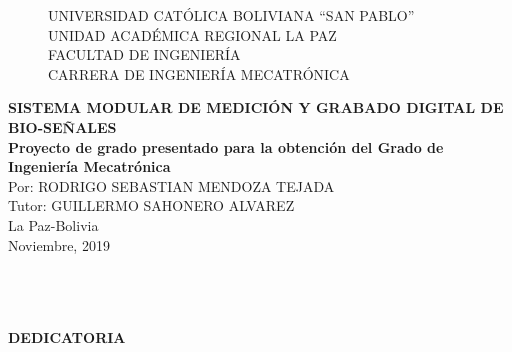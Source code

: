 \begin{center}
\begin{figure}
\centering%
\textsc{\large UNIVERSIDAD CAT\'OLICA BOLIVIANA ``SAN PABLO'' }\\[0.3cm] %
\textsc{\large UNIDAD ACAD\'EMICA REGIONAL LA PAZ}\\[0.3cm] %
\textsc{\large FACULTAD DE INGENIER\'IA}\\[0.3cm]
\textsc{\normalsize  CARRERA DE INGENIER\'IA MECATR\'ONICA}\\[0.1cm]
%
\end{figure}
\textbf{\large SISTEMA MODULAR DE MEDICIÓN Y GRABADO DIGITAL DE BIO-SEÑALES}\\[0.5cm]

\thispagestyle{empty} \vspace*{0.01cm} \textbf{\large Proyecto de grado presentado para la obtenci\'on del Grado de Ingenier\'ia Mecatr\'onica}\\[0.65cm]

\thispagestyle{empty} \vspace*{0.01cm} \normalsize Por: RODRIGO SEBASTIAN
MENDOZA TEJADA \\[0.8cm]

\thispagestyle{empty} \vspace*{0.01cm} \normalsize Tutor: GUILLERMO SAHONERO ALVAREZ\\[1.5cm]

\vspace*{0.01cm} \normalsize La Paz-Bolivia\\[0.25cm]
\vspace*{0.01cm} \normalsize Noviembre, 2019
\end{center}

\newpage{\pagestyle{empty}\cleardoublepage}

\newpage

\newpage{\pagestyle{empty}\cleardoublepage}

\newpage
\thispagestyle{empty} \textbf{}\normalsize
\\\\\\%
\textbf{DEDICATORIA}\\[4.0cm]

